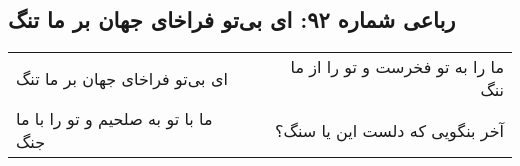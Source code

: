 \begin{center}
\section*{رباعی شماره ۹۲: ای بی‌تو فراخای جهان بر ما تنگ}
\label{sec:092}
\begin{longtable}{l p{0.5cm} r}
ای بی‌تو فراخای جهان بر ما تنگ
&&
ما را به تو فخرست و تو را از ما ننگ
\\
ما با تو به صلحیم و تو را با ما جنگ
&&
آخر بنگویی که دلست این یا سنگ؟
\\
\end{longtable}
\end{center}
